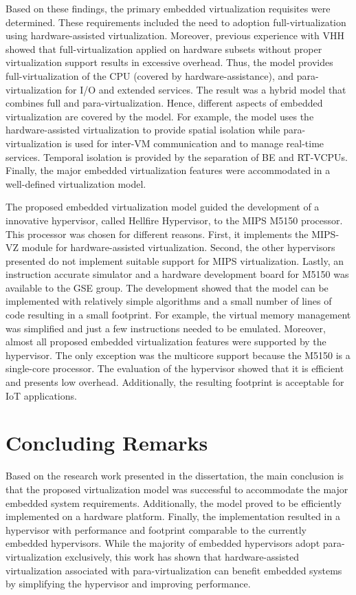 Based on these findings, the primary embedded virtualization requisites were determined. These requirements included the need to adoption full-virtualization using hardware-assisted virtualization. Moreover, previous experience with VHH showed that full-virtualization applied on hardware subsets without proper virtualization support results in excessive overhead.  Thus, the model provides full-virtualization of the CPU (covered by hardware-assistance), and para-virtualization for I/O and extended services. The result was a hybrid model that combines full and para-virtualization. Hence, different aspects of embedded virtualization are covered by the model. For example, the model uses the hardware-assisted virtualization to provide spatial isolation while para-virtualization is used for inter-VM communication and to manage real-time services. Temporal isolation is provided by the separation of BE and RT-VCPUs. Finally, the major embedded virtualization features were accommodated in a well-defined virtualization model. 

The proposed embedded virtualization model guided the development of a innovative hypervisor, called Hellfire Hypervisor, to the MIPS M5150 processor. This processor was chosen for different reasons. First, it implements the MIPS-VZ module for hardware-assisted virtualization. Second, the other hypervisors presented do not implement suitable support for MIPS virtualization. Lastly, an instruction accurate simulator and a hardware development board for M5150 was available to the GSE group. The development showed that the model can be implemented with relatively simple algorithms and a small number of lines of code resulting in a small footprint. For example, the virtual memory management was simplified and just a few instructions needed to be emulated. Moreover, almost all proposed embedded virtualization features were supported by the hypervisor. The only exception was the multicore support because the M5150 is a single-core processor. The evaluation of the hypervisor showed that it is efficient and presents low overhead. Additionally, the resulting footprint is acceptable for IoT applications. 

\section{Concluding Remarks}

Based on the research work presented in the dissertation, the main conclusion is that the proposed virtualization model was successful to accommodate the major embedded system requirements. Additionally, the model proved to be efficiently implemented on a hardware platform. Finally, the implementation resulted in a hypervisor with performance and footprint comparable to the currently embedded hypervisors. While the majority of embedded hypervisors adopt para-virtualization exclusively, this work has shown that hardware-assisted virtualization associated with para-virtualization can benefit embedded systems by simplifying the hypervisor and improving performance. 

